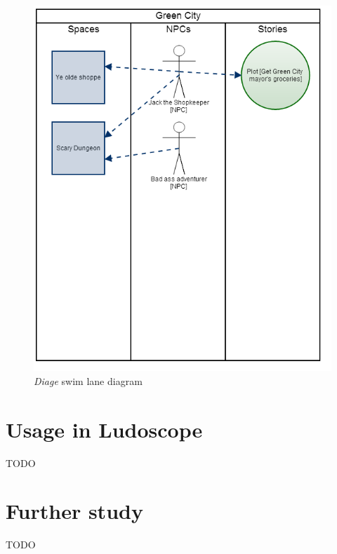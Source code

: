 \documentclass[11pt,a4paper,onecolumn,draft,titlepage]{article}
\newcommand{\diage}{\textsl{Diage }}
\begin{document}
\begin{figure}
\label{fig:swimlane}
\includegraphics[scale=0.5]{img/swimlanes}
\caption{\diage swim lane diagram}
\end{figure}
\section{Usage in Ludoscope}
\Huge TODO
\section{Further study}
\label{sec:further_study}
\Huge TODO
\normalsize	


\end{document}
